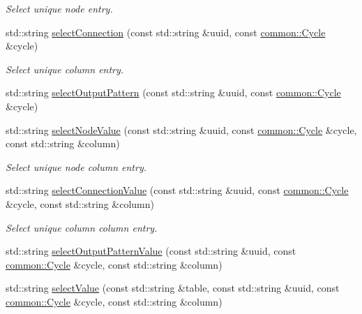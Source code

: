 \begin{DoxyCompactItemize}
\begin{DoxyCompactList}\small\item\em \-Select unique node entry. \end{DoxyCompactList}\item 
std\-::string \hyperlink{classcryomesh_1_1manager_1_1DatabaseManager_ab24de957b5908a4dc7d0c9146b43488b}{select\-Connection} (const std\-::string \&uuid, const \hyperlink{classcryomesh_1_1common_1_1Cycle}{common\-::\-Cycle} \&cycle)
\begin{DoxyCompactList}\small\item\em \-Select unique column entry. \end{DoxyCompactList}\item 
std\-::string \hyperlink{classcryomesh_1_1manager_1_1DatabaseManager_a04e8afc360e46b238415910dcafc2dd8}{select\-Output\-Pattern} (const std\-::string \&uuid, const \hyperlink{classcryomesh_1_1common_1_1Cycle}{common\-::\-Cycle} \&cycle)
\item 
std\-::string \hyperlink{classcryomesh_1_1manager_1_1DatabaseManager_a2a37d932ea951b4a45d4452e8631c1b4}{select\-Node\-Value} (const std\-::string \&uuid, const \hyperlink{classcryomesh_1_1common_1_1Cycle}{common\-::\-Cycle} \&cycle, const std\-::string \&column)
\begin{DoxyCompactList}\small\item\em \-Select unique node column entry. \end{DoxyCompactList}\item 
std\-::string \hyperlink{classcryomesh_1_1manager_1_1DatabaseManager_aaeb8756f7f7e62b152fa226cddbc191e}{select\-Connection\-Value} (const std\-::string \&uuid, const \hyperlink{classcryomesh_1_1common_1_1Cycle}{common\-::\-Cycle} \&cycle, const std\-::string \&column)
\begin{DoxyCompactList}\small\item\em \-Select unique column column entry. \end{DoxyCompactList}\item 
std\-::string \hyperlink{classcryomesh_1_1manager_1_1DatabaseManager_a31be85012297a3c2cda1ab43f7730986}{select\-Output\-Pattern\-Value} (const std\-::string \&uuid, const \hyperlink{classcryomesh_1_1common_1_1Cycle}{common\-::\-Cycle} \&cycle, const std\-::string \&column)
\item 
std\-::string \hyperlink{classcryomesh_1_1manager_1_1DatabaseManager_af2d4487c9955417740ecaeeb7e27db4f}{select\-Value} (const std\-::string \&table, const std\-::string \&uuid, const \hyperlink{classcryomesh_1_1common_1_1Cycle}{common\-::\-Cycle} \&cycle, const std\-::string \&column)

\end{DoxyCompactItemize}
